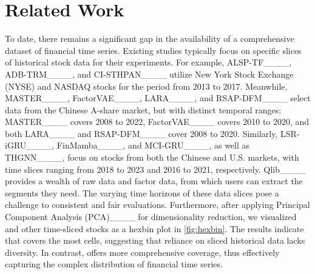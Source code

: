 \section{Related Work}
\label{sec:rela}


To date, there remains a significant gap in the availability of a comprehensive dataset of financial time series. Existing studies typically focus on specific slices of historical stock data for their experiments. For example, ALSP-TF____, ADB-TRM____, and CI-STHPAN____ utilize New York Stock Exchange (NYSE) and NASDAQ stocks for the period from 2013 to 2017. Meanwhile, MASTER____, FactorVAE____, LARA____, and RSAP-DFM____ select data from the Chinese A-share market, but with distinct temporal ranges: MASTER____ covers 2008 to 2022, FactorVAE____ covers 2010 to 2020, and both LARA____ and RSAP-DFM____ cover 2008 to 2020. Similarly, LSR-iGRU____, FinMamba____, and MCI-GRU____, as well as THGNN____, focus on stocks from both the Chinese and U.S. markets, with time slices ranging from 2018 to 2023 and 2016 to 2021, respectively. Qlib____ provides a wealth of raw data and factor data, from which users can extract the segments they need.
The varying time horizons of these data slices pose a challenge to consistent and fair evaluations.
Furthermore, after applying Principal Component Analysis (PCA)____ for dimensionality reduction, we visualized \name and other time-sliced stocks as a hexbin plot in \cref{fig:hexbin}. The results indicate that \name covers the most cells, suggesting that reliance on sliced historical data lacks diversity. In contrast, \name offers more comprehensive coverage, thus effectively capturing the complex distribution of financial time series.